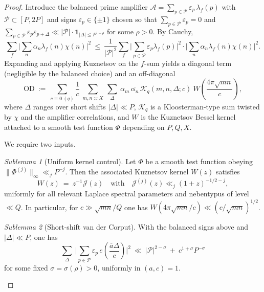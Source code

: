 \documentclass[11pt]{article}
\theoremstyle{definition}
\theoremstyle{remark}
\newtheorem{sublemma}{Sublemma}[section]
\numberwithin{equation}{part}
\begin{document}
\begin{proof}
	Introduce the balanced prime amplifier $\mathcal A=\sum_{p\in\mathcal P}\varepsilon_p\,\lambda_f(p)$ with $\mathcal P\subset [P,2P]$ and signs $\varepsilon_p\in\{\pm1\}$ chosen so that $\sum_{p\in\mathcal P}\varepsilon_p=0$ and $\sum_{p\in\mathcal P}\varepsilon_p\varepsilon_{p+\Delta}\ll |\mathcal P|\cdot \mathbf 1_{|\Delta|\le P^{1-\rho}}$ for some $\rho>0$. By Cauchy,
	\[
		\sum_f \Big|\sum_{n}\alpha_n \lambda_f(n)\chi(n)\Big|^2
		\ \le\ \frac{1}{|\mathcal P|^2}\sum_f \Big|\sum_{p\in\mathcal P}\varepsilon_p\lambda_f(p)\Big|^2 \cdot
		\Big|\sum_{n}\alpha_n \lambda_f(n)\chi(n)\Big|^2.
	\]
	Expanding and applying Kuznetsov on the $f$-sum yields a diagonal term (negligible by the balanced choice) and an off-diagonal
	\begin{equation}\label{eq:OD}
		\mathrm{OD}\ :=\ \sum_{c\equiv 0 \ (q)} \frac{1}{c}\ \sum_{m,n\asymp X}\ \sum_{\Delta}\ \alpha_m\,\overline{\alpha_n}\, \mathcal K_{q}(m,n,\Delta;c)\ W\!\left(\frac{4\pi\sqrt{mn}}{c}\right),
	\end{equation}
	where $\Delta$ ranges over short shifts $|\Delta|\ll P$, $\mathcal K_q$ is a Kloosterman-type sum twisted by $\chi$ and the amplifier correlations, and $W$ is the Kuznetsov Bessel kernel attached to a smooth test function $\Phi$ depending on $P,Q,X$.

	We require two inputs.

	\begin{sublemma}[Uniform kernel control]\label{sub:kernel}
		Let $\Phi$ be a smooth test function obeying $\|\Phi^{(j)}\|_\infty\ll_j P^{-j}$. Then the associated Kuznetsov kernel $W(z)$ satisfies
		\[
			W(z)\ =\ z^{-1}\mathcal J(z)\quad \text{with}\quad \mathcal J^{(j)}(z)\ll_j (1+z)^{-1/2-j},
		\]
		uniformly for all relevant Laplace spectral parameters and nebentypus of level $\ll Q$. In particular, for $c\gg \sqrt{mn}/Q$ one has $W(4\pi\sqrt{mn}/c)\ll (c/\sqrt{mn})^{1/2}$.
	\end{sublemma}

	\begin{sublemma}[Short-shift van der Corput]\label{sub:vdc}
		With the balanced signs above and $|\Delta|\ll P$, one has
		\[
			\sum_{\Delta}\ \Big|\sum_{p\in\mathcal P}\varepsilon_p\,e\!\left(\frac{\overline a \Delta}{c}\right)\Big|^2 \ \ll\ |\mathcal P|^{2-\sigma}\ +\ c^{1+\sigma}P^{-\sigma}
		\]
		for some fixed $\sigma=\sigma(\rho)>0$, uniformly in $(a,c)=1$.
	\end{sublemma}


\end{proof}
\end{document}
